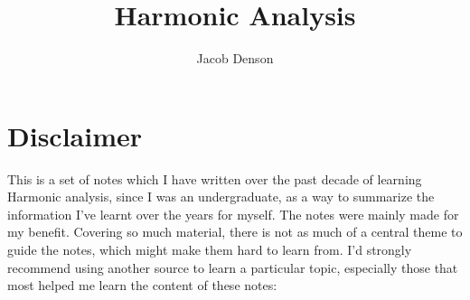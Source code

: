 

\title{Harmonic Analysis}
\author{Jacob Denson}


\makeatletter
\renewcommand*\l@section{\@dottedtocline{1}{1.5em}{3em}}
\makeatother



\maketitle

\chapter*{Disclaimer}

This is a set of notes which I have written over the past decade of learning Harmonic analysis, since I was an undergraduate, as a way to summarize the information I've learnt over the years for myself. The notes were mainly made for my benefit. Covering so much material, there is not as much of a central theme to guide the notes, which might make them hard to learn from. I'd strongly recommend using another source to learn a particular topic, especially those that most helped me learn the content of these notes:


